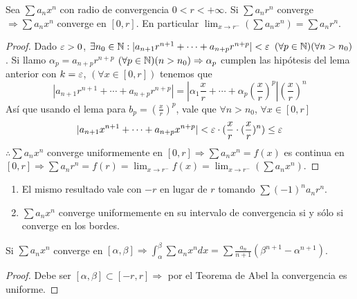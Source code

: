 \begin{theorem}[Abel]
  Sea $\sum a_n x^n$ con radio de convergencia $0 < r < +\infty$. Si $\sum a_n r^n$ converge $\Rightarrow \sum a_n x^n$ converge en $[0, r]$. En particular $\lim_{x \to r^-} (\sum a_n x^n) = \sum a_n r^n$.
  \begin{proof}
    Dado $\varepsilon > 0$, $\exists n_0 \in \mathbb{N} : |a_{n+1} r^{n+1} + \cdots + a_{n+p} r^{n+p}| < \varepsilon$ $(\forall p \in \mathbb{N}) (\forall n > n_0)$. Si llamo $\alpha_p = a_{n+p} r^{n+p}$ $(\forall p \in \mathbb{N})(n > n_0) \Rightarrow \alpha_p$
    cumplen las hipótesis del lema anterior con $k = \varepsilon$, $(\forall x \in [0, r])$ tenemos que \begin{equation}
      |a_{n+1} r^{n+1} + \cdots + a_{n+p} r^{n+p}| = |\alpha_1 \frac{x}{r} + \cdots + \alpha_p (\frac{x}{r})^p| (\frac{x}{r})^n
    \end{equation} Así que usando el lema para $b_p = (\frac{x}{r})^p$, vale que $\forall n > n_0$, $\forall x \in [0, r]$
    \begin{equation}
      |a_{n+1} x^{n+1} + \cdots + a_{n + p} x^{n+p}| < \varepsilon \cdot (\frac{x}{r} \cdot (\frac{x}{r})^n) \leq \varepsilon
    \end{equation} $\therefore \sum a_n x^n$ converge uniformemente en $[0, r] \Rightarrow \sum a_n x^n = f(x)$ es continua en $[0, r] \Rightarrow \sum a_n r^n = f(r) = \lim_{x \to r^-} f(x) = \lim_{x \to r^-} (\sum a_n x^n)$.
  \end{proof}
\end{theorem}

\begin{note}
  \begin{enumerate}
    \item El mismo resultado vale con $-r$ en lugar de $r$ tomando $\sum (-1)^n a_n r^n$.
    \item $\sum a_n x^n$ converge uniformemente en su intervalo de convergencia si y sólo si converge en los bordes.
  \end{enumerate}
\end{note}

\begin{theorem}
  Si $\sum a_n x^n$ converge en $[\alpha, \beta] \Rightarrow \int_{\alpha}^{\beta} \sum a_n x^n dx = \sum \frac{a_n}{n+1} (\beta^{n+1} - \alpha^{n+1})$.
  \begin{proof}
    Debe ser $[\alpha, \beta] \subset [-r, r] \Rightarrow$ por el Teorema de Abel la convergencia es uniforme.
  \end{proof}
\end{theorem}

